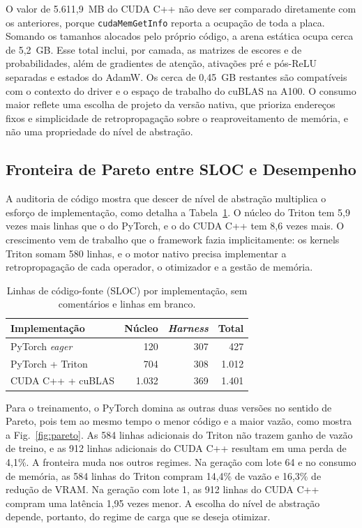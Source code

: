 \documentclass[conference]{IEEEtran}
\begin{document}
O valor de 5.611,9~MB do CUDA C++ não deve ser comparado diretamente com os anteriores, porque \texttt{cudaMemGetInfo} reporta a ocupação de toda a placa. Somando os tamanhos alocados pelo próprio código, a arena estática ocupa cerca de 5,2~GB. Esse total inclui, por camada, as matrizes de escores e de probabilidades, além de gradientes de atenção, ativações pré e pós-ReLU separadas e estados do AdamW. Os cerca de 0,45~GB restantes são compatíveis com o contexto do driver e o espaço de trabalho do cuBLAS na A100. O consumo maior reflete uma escolha de projeto da versão nativa, que prioriza endereços fixos e simplicidade de retropropagação sobre o reaproveitamento de memória, e não uma propriedade do nível de abstração.

\subsection{Fronteira de Pareto entre SLOC e Desempenho}

A auditoria de código mostra que descer de nível de abstração multiplica o esforço de implementação, como detalha a Tabela~\ref{tab:sloc}. O núcleo do Triton tem 5,9 vezes mais linhas que o do PyTorch, e o do CUDA C++ tem 8,6 vezes mais. O crescimento vem de trabalho que o framework fazia implicitamente: os kernels Triton somam 580 linhas, e o motor nativo precisa implementar a retropropagação de cada operador, o otimizador e a gestão de memória.

\begin{table}[t]
\centering
\caption{Linhas de código-fonte (SLOC) por implementação, sem comentários e linhas em branco.}
\label{tab:sloc}
\begin{tabular}{@{}lrrr@{}}
\toprule
Implementação & Núcleo & \textit{Harness} & Total \\
\midrule
PyTorch \textit{eager} & 120 & 307 & 427 \\
PyTorch + Triton & 704 & 308 & 1.012 \\
CUDA C++ + cuBLAS & 1.032 & 369 & 1.401 \\
\bottomrule
\end{tabular}
\end{table}

Para o treinamento, o PyTorch domina as outras duas versões no sentido de Pareto, pois tem ao mesmo tempo o menor código e a maior vazão, como mostra a Fig.~\ref{fig:pareto}. As 584 linhas adicionais do Triton não trazem ganho de vazão de treino, e as 912 linhas adicionais do CUDA C++ resultam em uma perda de 4,1\%. A fronteira muda nos outros regimes. Na geração com lote 64 e no consumo de memória, as 584 linhas do Triton compram 14,4\% de vazão e 16,3\% de redução de VRAM. Na geração com lote 1, as 912 linhas do CUDA C++ compram uma latência 1,95 vezes menor. A escolha do nível de abstração depende, portanto, do regime de carga que se deseja otimizar.
\end{document}
